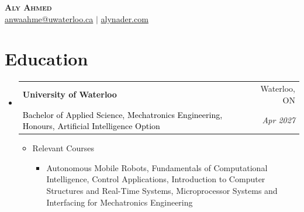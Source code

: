 \documentclass[11pt, letterpaper]{article}
\makeatletter
\newcommand{\resumeItem}[1]{
  \item\small{
    {#1 \vspace{-2pt}}
  }
}
\newcommand{\resumeSubItem}[1]{
  \begin{itemize}
    \item\small{#1 \vspace{-2pt}}
  \end{itemize}
}
\newcommand{\resumeSubheading}[4]{
  \vspace{-2pt}\item
    \begin{tabular*}{0.97\textwidth}[t]{l@{\extracolsep{\fill}}r}
      \textbf{#1} & #2 \\
      \textcolor{egyptianBlue}{\small#3} & \textit{\small #4} \\
    \end{tabular*}\vspace{-7pt}
}
\newcommand{\resumeSubHeadingListStart}{\begin{itemize}[leftmargin=0.15in, label={}]}
\newcommand{\resumeSubHeadingListEnd}{\end{itemize}}
\newcommand{\resumeItemListStart}{\begin{itemize}}
\newcommand{\resumeItemListEnd}{\end{itemize}\vspace{-5pt}}
\makeatother
\begin{document}

\begin{center}
    \textbf{\Huge \scshape Aly Ahmed} \\ \vspace{1pt}
    \href{mailto:anwaahme@uwaterloo.ca}{\textcolor{egyptianBlue}{anwaahme@uwaterloo.ca}} $|$
    \small\href{https://alynader.com}{\textcolor{egyptianBlue}{alynader.com}} 
\end{center}


\section{Education}
  \resumeSubHeadingListStart
    \resumeSubheading
      {University of Waterloo}{Waterloo, ON}
      {\textcolor{black}{Bachelor of Applied Science, Mechatronics Engineering, Honours, Artificial Intelligence Option}}{Apr 2027}
      \resumeItemListStart
      \resumeItem{Relevant Courses}
        \resumeSubItem{Autonomous Mobile Robots, Fundamentals of Computational Intelligence, Control Applications, Introduction to Computer Structures and Real-Time Systems, Microprocessor Systems and Interfacing for Mechatronics Engineering}
        \resumeItemListEnd
  \resumeSubHeadingListEnd
 
\end{document}
